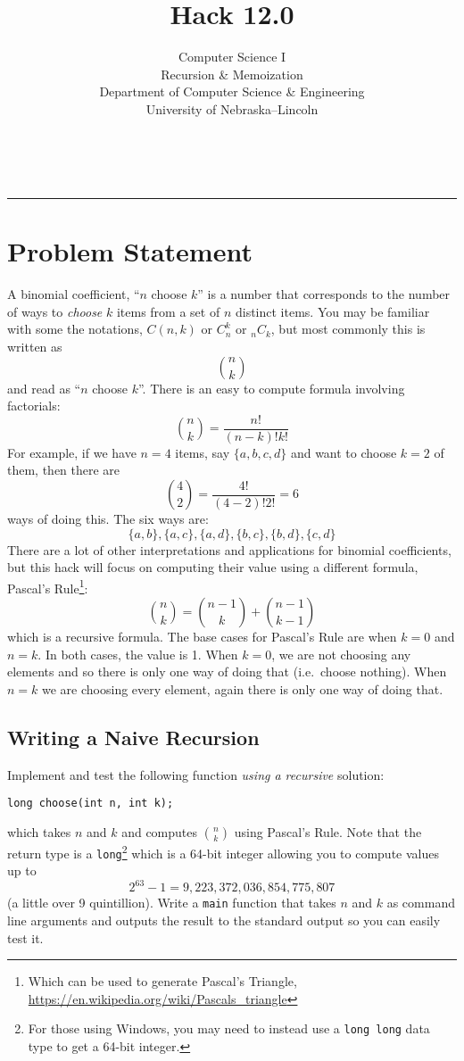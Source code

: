 \documentclass[12pt]{scrartcl}
\title{Hack 12.0}\let\Title\@title
\subtitle{Computer Science I\\
Recursion \& Memoization\\
{\small
\vskip1cm
Department of Computer Science \& Engineering \\
University of Nebraska--Lincoln}
\vskip-3cm}
\date{~}
\begin{document}
\maketitle

\hrule



\section*{Problem Statement}

A binomial coefficient, ``$n$ choose $k$'' is a number that corresponds 
to the number of ways to \emph{choose} $k$ items from a set of $n$ distinct
items.  You may be familiar with some the notations, $C(n,k)$ or $C_n^k$ 
or ${}_{n}C_k $, but most commonly this is written as 
  $${n \choose k}$$
and read as ``$n$ choose $k$''.  There is an easy to compute formula involving
factorials:
  $${n \choose k} = \frac{n!}{(n-k)!k!}$$
For example, if we have $n = 4$ items, say $\{a, b, c, d\}$ and want to choose
$k=2$ of them, then there are 
  $${4 \choose 2} = \frac{4!}{(4-2)!2!} = 6$$
ways of doing this.  The six ways are:
  $$\{a, b\}, \{a, c\}, \{a, d\}, \{b, c\}, \{b, d\}, \{c, d\}$$
There are a lot of other interpretations and applications for binomial 
coefficients, but this hack will focus on computing their value using
a different formula, Pascal's Rule\footnote{Which can be used to generate
Pascal's Triangle, \url{https://en.wikipedia.org/wiki/Pascals_triangle}}:
  $${n \choose k} = {n-1 \choose k} + {n-1 \choose k-1}$$
which is a recursive formula.  The base cases for Pascal's Rule are when
$k = 0$ and $n = k$.  In both cases, the value is 1.  When $k = 0$, we are
not choosing any elements and so there is only one way of doing that (i.e.\
choose nothing).  When $n = k$ we are choosing every element, again there
is only one way of doing that.  

\subsection*{Writing a Naive Recursion}

Implement and test the following function \emph{using a recursive} 
solution:

\texttt{long choose(int n, int k);}

which takes $n$ and $k$ and computes ${n\choose k}$ using Pascal's Rule.
Note that the return type is a \texttt{long}\footnote{For those
using Windows, you may need to instead use a \texttt{long long}
data type to get a 64-bit integer.} which is a 64-bit
integer allowing you to compute values up to 
  $$2^{63}-1 = 9,223,372,036,854,775,807$$
(a little over 9 quintillion).  Write a \texttt{main} function
that takes $n$ and $k$ as command line arguments and outputs the result
to the standard output so you can easily test it.
\end{document}
